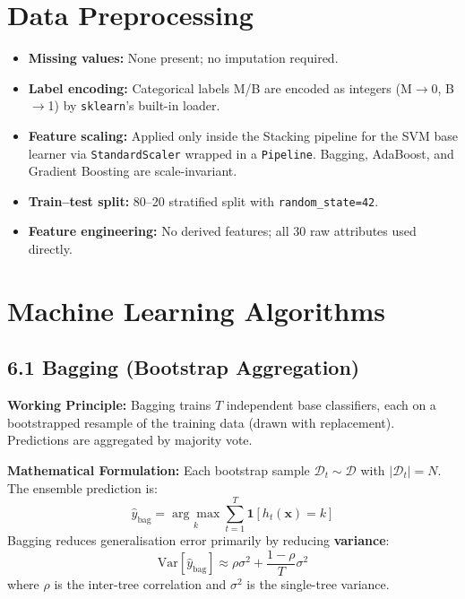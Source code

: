 \documentclass[12pt,a4paper]{article}
\begin{document}
\section{Data Preprocessing}

\begin{itemize}[noitemsep]
  \item \textbf{Missing values:} None present; no imputation required.
  \item \textbf{Label encoding:} Categorical labels M/B are encoded as integers
        (M$\rightarrow$0, B$\rightarrow$1) by \texttt{sklearn}'s built-in loader.
  \item \textbf{Feature scaling:} Applied only inside the Stacking pipeline for the SVM base
        learner via \texttt{StandardScaler} wrapped in a \texttt{Pipeline}.
        Bagging, AdaBoost, and Gradient Boosting are scale-invariant.
  \item \textbf{Train--test split:} 80--20 stratified split with \texttt{random\_state=42}.
  \item \textbf{Feature engineering:} No derived features; all 30 raw attributes used directly.
\end{itemize}

\section{Machine Learning Algorithms}

\subsection*{6.1 Bagging (Bootstrap Aggregation)}

\textbf{Working Principle:}
Bagging trains $T$ independent base classifiers, each on a bootstrapped resample of the training
data (drawn with replacement). Predictions are aggregated by majority vote.

\textbf{Mathematical Formulation:}
Each bootstrap sample $\mathcal{D}_t \sim \mathcal{D}$ with $|\mathcal{D}_t| = N$.
The ensemble prediction is:
\[
\hat{y}_{\text{bag}} = \underset{k}{\arg\max} \sum_{t=1}^{T} \mathbf{1}[h_t(\mathbf{x}) = k]
\]
Bagging reduces generalisation error primarily by reducing \textbf{variance}:
\[
\text{Var}[\hat{y}_{\text{bag}}] \approx \rho \sigma^2 + \frac{1-\rho}{T} \sigma^2
\]
where $\rho$ is the inter-tree correlation and $\sigma^2$ is the single-tree variance.
\end{document}
